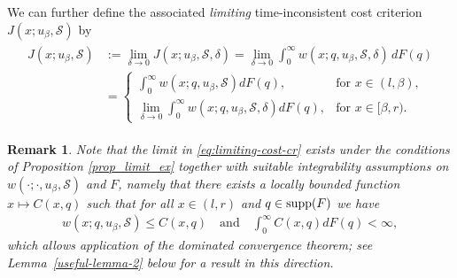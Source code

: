\documentclass[11pt]{article} %
\newtheorem{remark}[theorem]{Remark}
\numberwithin{komcounter}{section}
\begin{document}
We can further define the associated {\it limiting} time-inconsistent cost criterion $J(x; u_\beta, \mathcal{S})$ by
\begin{align} \label{eq:limiting-cost-cr}
\begin{split}
J(x; u_\beta, \mathcal{S}) 
&:= 
\lim_{\delta \to 0} J(x;u_\beta,\mathcal{S},\delta) 
= \lim_{\delta \to 0} \int_0^\infty w(x;q, u_\beta, \mathcal{S}, \delta) \, dF(q) \\
&=\begin{cases} 
\int_0^\infty w(x;q, u_\beta, \mathcal{S}) dF(q), & \text{for } x\in(l,\beta), \\
\lim_{\delta\to 0} \int_0^\infty w(x;q, u_\beta, \mathcal{S},\delta) dF(q), & \text{for } x \in [\beta,r).
\end{cases}
\end{split}
\end{align}

\begin{remark}\label{ghghffsa}
Note that the limit in \eqref{eq:limiting-cost-cr} exists under the conditions of Proposition \ref{prop_limit_ex} together with suitable integrability assumptions on $w(\cdot; \cdot, u_\beta, \mathcal{S})$ and $F$, namely that there exists a locally bounded function $x \mapsto C(x,q)$ such that for all $x\in (l,r)$ and $q\in {\rm supp}(F)$ we have
\begin{align*}
w(x;q, u_\beta, \mathcal{S}) \leq C(x,q) 
\quad \text{and} \quad 
\int_0^\infty C(x,q)dF(q)<\infty,
\end{align*}
which allows application of the dominated convergence theorem; see Lemma~\ref{useful-lemma-2} below for a result in this direction. 
\end{remark}
\end{document}
